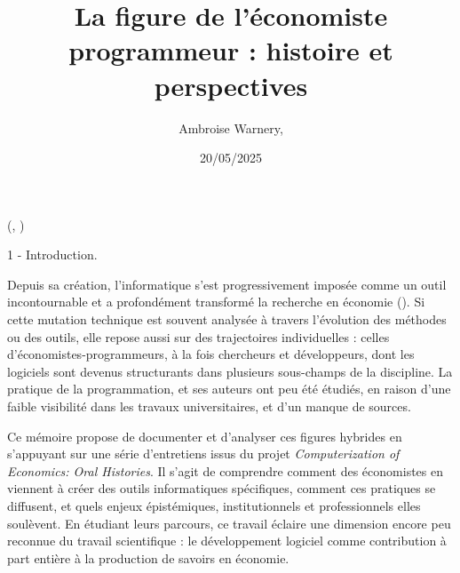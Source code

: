 \documentclass{beamer}
\title{La figure de l'économiste programmeur : histoire et perspectives}
\author{%
	Ambroise Warnery, \email{ambroise.warnery@gmail.com}
}
\institute{%
Université Paris 1 Panthéon Sorbonne, France
} %
\date{20/05/2025}
\newlength{\blockOne}
\begin{document}


\begin{frame}[t]	%





\TPshowboxestrue




\begin{textblock*}{\colwidth}(\leftmargin, \blockOne)

	\begin{alertblock}{1 - Introduction.}
	\RaggedRight
	\vspace{0.25cm}

	Depuis sa création, l'informatique s'est progressivement imposée comme un outil incontournable et a profondément transformé la recherche en économie (\cite{backhouseItsComputersStupid2017}). Si cette mutation technique est souvent analysée à travers l’évolution des méthodes ou des outils, elle repose aussi sur des trajectoires individuelles : celles d’économistes-programmeurs, à la fois chercheurs et développeurs, dont les logiciels sont devenus structurants dans plusieurs sous-champs de la discipline. La pratique de la programmation, et ses auteurs ont peu été étudiés, en raison d'une faible visibilité dans les travaux universitaires, et d'un manque de sources.
	\vspace{0.5em}

	Ce mémoire propose de documenter et d’analyser ces figures hybrides en s’appuyant sur une série d’entretiens issus du projet \textit{Computerization of Economics: Oral Histories}. Il s’agit de comprendre comment des économistes en viennent à créer des outils informatiques spécifiques, comment ces pratiques se diffusent, et quels enjeux épistémiques, institutionnels et professionnels elles soulèvent. En étudiant leurs parcours, ce travail éclaire une dimension encore peu reconnue du travail scientifique : le développement logiciel comme contribution à part entière à la production de savoirs en économie.
	\vspace{0.25cm}
	\end{alertblock}


\end{textblock*}
\end{frame}
\end{document}
